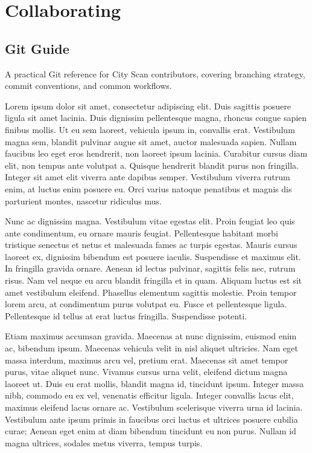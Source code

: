\documentclass[
  letterpaper,
  DIV=11,
  numbers=noendperiod]{scrreprt}
\begin{document}
\part{Collaborating}

\chapter{Git Guide}\label{git-guide}

A practical Git reference for City Scan contributors, covering branching
strategy, commit conventions, and common workflows.

Lorem ipsum dolor sit amet, consectetur adipiscing elit. Duis sagittis
posuere ligula sit amet lacinia. Duis dignissim pellentesque magna,
rhoncus congue sapien finibus mollis. Ut eu sem laoreet, vehicula ipsum
in, convallis erat. Vestibulum magna sem, blandit pulvinar augue sit
amet, auctor malesuada sapien. Nullam faucibus leo eget eros hendrerit,
non laoreet ipsum lacinia. Curabitur cursus diam elit, non tempus ante
volutpat a. Quisque hendrerit blandit purus non fringilla. Integer sit
amet elit viverra ante dapibus semper. Vestibulum viverra rutrum enim,
at luctus enim posuere eu. Orci varius natoque penatibus et magnis dis
parturient montes, nascetur ridiculus mus.

Nunc ac dignissim magna. Vestibulum vitae egestas elit. Proin feugiat
leo quis ante condimentum, eu ornare mauris feugiat. Pellentesque
habitant morbi tristique senectus et netus et malesuada fames ac turpis
egestas. Mauris cursus laoreet ex, dignissim bibendum est posuere
iaculis. Suspendisse et maximus elit. In fringilla gravida ornare.
Aenean id lectus pulvinar, sagittis felis nec, rutrum risus. Nam vel
neque eu arcu blandit fringilla et in quam. Aliquam luctus est sit amet
vestibulum eleifend. Phasellus elementum sagittis molestie. Proin tempor
lorem arcu, at condimentum purus volutpat eu. Fusce et pellentesque
ligula. Pellentesque id tellus at erat luctus fringilla. Suspendisse
potenti.

Etiam maximus accumsan gravida. Maecenas at nunc dignissim, euismod enim
ac, bibendum ipsum. Maecenas vehicula velit in nisl aliquet ultricies.
Nam eget massa interdum, maximus arcu vel, pretium erat. Maecenas sit
amet tempor purus, vitae aliquet nunc. Vivamus cursus urna velit,
eleifend dictum magna laoreet ut. Duis eu erat mollis, blandit magna id,
tincidunt ipsum. Integer massa nibh, commodo eu ex vel, venenatis
efficitur ligula. Integer convallis lacus elit, maximus eleifend lacus
ornare ac. Vestibulum scelerisque viverra urna id lacinia. Vestibulum
ante ipsum primis in faucibus orci luctus et ultrices posuere cubilia
curae; Aenean eget enim at diam bibendum tincidunt eu non purus. Nullam
id magna ultrices, sodales metus viverra, tempus turpis.
\end{document}
